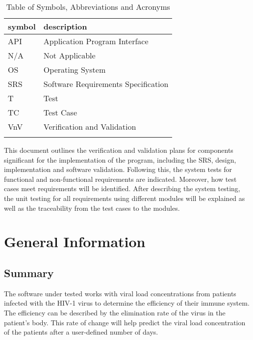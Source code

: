 \documentclass[12pt, titlepage]{article}
\begin{document}
\begin{table}[H]
\renewcommand{\arraystretch}{1.2}
\noindent \begin{longtable*}{l p{8cm}} \toprule
\textbf{symbol} & \textbf{description}\\
\midrule 
API & Application Program Interface 
\\
N/A & Not Applicable
\\
OS & Operating System
\\
SRS & Software Requirements Specification
\\
T & Test 
\\
TC & Test Case 
\\
VnV & Verification and Validation 
\\
&\\
\bottomrule

\end{longtable*}
\caption{Table of Symbols, Abbreviations and Acronyms}
\end{table}


\newpage


This document outlines the verification and validation plans for components 
significant for the implementation of the \progname{} program, including the 
SRS, design, implementation and software validation. Following this, the system 
tests for functional and non-functional requirements are indicated. Moreover, 
how test cases meet requirements will be identified. After describing the system 
testing, the unit testing for all requirements using different modules will be 
explained as well as the traceability from the test cases to the modules.

\section{General Information}

\subsection{Summary}

The software under tested works with viral load concentrations from patients 
infected with the HIV-1 virus to determine the efficiency of their immune 
system. 
The efficiency can be described by the elimination rate of the virus in the 
patient's body.
This rate of change will help predict the viral load concentration of the 
patients after a user-defined number of days. 
\end{document}
